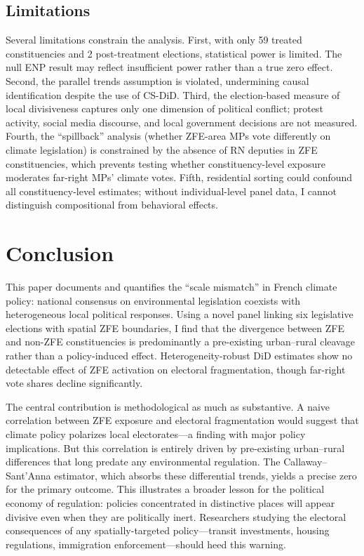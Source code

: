 \documentclass[12pt]{article}
\begin{document}
\subsection{Limitations}

Several limitations constrain the analysis. First, with only 59 treated constituencies and 2 post-treatment elections, statistical power is limited. The null ENP result may reflect insufficient power rather than a true zero effect. Second, the parallel trends assumption is violated, undermining causal identification despite the use of CS-DiD. Third, the election-based measure of local divisiveness captures only one dimension of political conflict; protest activity, social media discourse, and local government decisions are not measured. Fourth, the ``spillback'' analysis (whether ZFE-area MPs vote differently on climate legislation) is constrained by the absence of RN deputies in ZFE constituencies, which prevents testing whether constituency-level exposure moderates far-right MPs' climate votes. Fifth, residential sorting could confound all constituency-level estimates; without individual-level panel data, I cannot distinguish compositional from behavioral effects.


\section{Conclusion}

This paper documents and quantifies the ``scale mismatch'' in French climate policy: national consensus on environmental legislation coexists with heterogeneous local political responses. Using a novel panel linking six legislative elections with spatial ZFE boundaries, I find that the divergence between ZFE and non-ZFE constituencies is predominantly a pre-existing urban--rural cleavage rather than a policy-induced effect. Heterogeneity-robust DiD estimates show no detectable effect of ZFE activation on electoral fragmentation, though far-right vote shares decline significantly.

The central contribution is methodological as much as substantive. A naive correlation between ZFE exposure and electoral fragmentation would suggest that climate policy polarizes local electorates---a finding with major policy implications. But this correlation is entirely driven by pre-existing urban--rural differences that long predate any environmental regulation. The Callaway--Sant'Anna estimator, which absorbs these differential trends, yields a precise zero for the primary outcome. This illustrates a broader lesson for the political economy of regulation: policies concentrated in distinctive places will appear divisive even when they are politically inert. Researchers studying the electoral consequences of any spatially-targeted policy---transit investments, housing regulations, immigration enforcement---should heed this warning.
\end{document}
